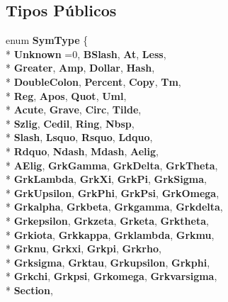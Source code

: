 \subsection*{Tipos Públicos}
\begin{DoxyCompactItemize}
\item 
enum {\bfseries Sym\-Type} \{ \\*
{\bfseries Unknown} =0, 
{\bfseries B\-Slash}, 
{\bfseries At}, 
{\bfseries Less}, 
\\*
{\bfseries Greater}, 
{\bfseries Amp}, 
{\bfseries Dollar}, 
{\bfseries Hash}, 
\\*
{\bfseries Double\-Colon}, 
{\bfseries Percent}, 
{\bfseries Copy}, 
{\bfseries Tm}, 
\\*
{\bfseries Reg}, 
{\bfseries Apos}, 
{\bfseries Quot}, 
{\bfseries Uml}, 
\\*
{\bfseries Acute}, 
{\bfseries Grave}, 
{\bfseries Circ}, 
{\bfseries Tilde}, 
\\*
{\bfseries Szlig}, 
{\bfseries Cedil}, 
{\bfseries Ring}, 
{\bfseries Nbsp}, 
\\*
{\bfseries Slash}, 
{\bfseries Lsquo}, 
{\bfseries Rsquo}, 
{\bfseries Ldquo}, 
\\*
{\bfseries Rdquo}, 
{\bfseries Ndash}, 
{\bfseries Mdash}, 
{\bfseries Aelig}, 
\\*
{\bfseries A\-Elig}, 
{\bfseries Grk\-Gamma}, 
{\bfseries Grk\-Delta}, 
{\bfseries Grk\-Theta}, 
\\*
{\bfseries Grk\-Lambda}, 
{\bfseries Grk\-Xi}, 
{\bfseries Grk\-Pi}, 
{\bfseries Grk\-Sigma}, 
\\*
{\bfseries Grk\-Upsilon}, 
{\bfseries Grk\-Phi}, 
{\bfseries Grk\-Psi}, 
{\bfseries Grk\-Omega}, 
\\*
{\bfseries Grkalpha}, 
{\bfseries Grkbeta}, 
{\bfseries Grkgamma}, 
{\bfseries Grkdelta}, 
\\*
{\bfseries Grkepsilon}, 
{\bfseries Grkzeta}, 
{\bfseries Grketa}, 
{\bfseries Grktheta}, 
\\*
{\bfseries Grkiota}, 
{\bfseries Grkkappa}, 
{\bfseries Grklambda}, 
{\bfseries Grkmu}, 
\\*
{\bfseries Grknu}, 
{\bfseries Grkxi}, 
{\bfseries Grkpi}, 
{\bfseries Grkrho}, 
\\*
{\bfseries Grksigma}, 
{\bfseries Grktau}, 
{\bfseries Grkupsilon}, 
{\bfseries Grkphi}, 
\\*
{\bfseries Grkchi}, 
{\bfseries Grkpsi}, 
{\bfseries Grkomega}, 
{\bfseries Grkvarsigma}, 
\\*
{\bfseries Section}, 

\end{DoxyCompactItemize}
